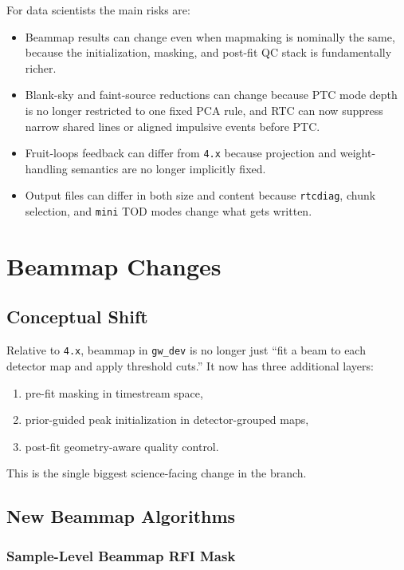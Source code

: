 \documentclass[11pt]{article}
\begin{document}
For data scientists the main risks are:

\begin{itemize}[leftmargin=1.5em]
\item Beammap results can change even when mapmaking is nominally the same, because the initialization, masking, and post-fit QC stack is fundamentally richer.
\item Blank-sky and faint-source reductions can change because PTC mode depth is no longer restricted to one fixed PCA rule, and RTC can now suppress narrow shared lines or aligned impulsive events before PTC.
\item Fruit-loops feedback can differ from \texttt{4.x} because projection and weight-handling semantics are no longer implicitly fixed.
\item Output files can differ in both size and content because \texttt{rtcdiag}, chunk selection, and \texttt{mini} TOD modes change what gets written.
\end{itemize}

\section{Beammap Changes}

\subsection{Conceptual Shift}

Relative to \texttt{4.x}, beammap in \texttt{gw\_dev} is no longer just
``fit a beam to each detector map and apply threshold cuts.'' It now has three
additional layers:

\begin{enumerate}[leftmargin=1.5em]
\item pre-fit masking in timestream space,
\item prior-guided peak initialization in detector-grouped maps,
\item post-fit geometry-aware quality control.
\end{enumerate}

This is the single biggest science-facing change in the branch.

\subsection{New Beammap Algorithms}

\subsubsection{Sample-Level Beammap RFI Mask}
\end{document}
